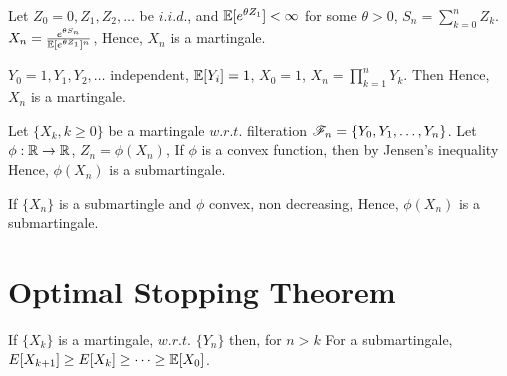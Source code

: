 \documentclass[all-lectures.tex]{subfiles}
\begin{document}
\begin{exmp}
Let $Z_0=0, Z_1, Z_2, \dots $ be $i.i.d.$, and $\mathbb{E}[e^{\theta Z_1}] < \infty$ for some $\theta >0$, $S_n = \sum_{k=0}^{n} Z_k$. $X_n = \frac{e^{\theta S_n}}{\mathbb{E}[e^{\theta Z_1}]^n}$,
Hence, $X_n$ is a martingale.
\end{exmp}

\begin{exmp}
	$Y_0 = 1, Y_1, Y_2, \dots$	independent, $\mathbb{E}[Y_i] = 1$, $X_0 =1$, $X_n = \prod_{k=1}^{n} Y_k$. Then
	Hence, $X_n$ is a martingale.
\end{exmp}

\begin{exmp}
Let $\{X_k, k\ge 0\}$ be a martingale $w.r.t.$ filteration $\mathscr{F}_n=\{Y_0, Y_1, \dots, Y_ n\}$. Let $\phi:\mathbb{R} \to \mathbb{R}$, $Z_n = \phi(X_n)$,
If $\phi$ is a convex function, then by Jensen's inequality
Hence, $\phi(X_n)$ is a submartingale.
\end{exmp}
If $\{X_n\}$ is a submartingle and $\phi$ convex, non decreasing,
Hence, $\phi(X_n)$ is a submartingale.

\section{Optimal Stopping Theorem}


If $\{X_k\}$ is a martingale, $w.r.t.$ $\{Y_n\}$ then, for $n>k$
For a submartingale, $E[X_{k+1}] \ge E[X_k] \ge \dots \ge \mathbb{E}[X_0]$.
\end{document}
